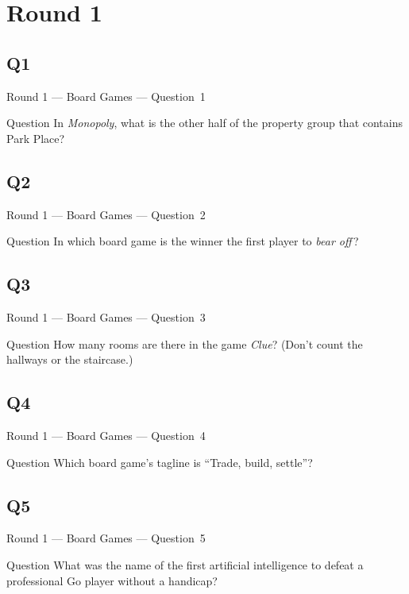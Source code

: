 \documentclass[11pt]{beamer}
\begin{document}
\section{Round 1}
\subsection*{Q1}
\begin{frame}[t]{Round 1 --- Board Games --- \mbox{Question 1}}
    \vspace{-0.5em}
    \begin{block}{Question}
        In \emph{Monopoly}, what is the other half of the property group that contains Park Place?
    \end{block}
\end{frame}
\subsection*{Q2}
\begin{frame}[t]{Round 1 --- Board Games --- \mbox{Question 2}}
    \vspace{-0.5em}
    \begin{block}{Question}
        In which board game is the winner the first player to \emph{bear off}\,?
    \end{block}
\end{frame}
\subsection*{Q3}
\begin{frame}[t]{Round 1 --- Board Games --- \mbox{Question 3}}
    \vspace{-0.5em}
    \begin{block}{Question}
        How many rooms are there in the game \emph{Clue}? (Don't count the hallways or the staircase.)
    \end{block}
\end{frame}
\subsection*{Q4}
\begin{frame}[t]{Round 1 --- Board Games --- \mbox{Question 4}}
    \vspace{-0.5em}
    \begin{block}{Question}
        Which board game's tagline is ``Trade, build, settle''?
    \end{block}
\end{frame}
\subsection*{Q5}
\begin{frame}[t]{Round 1 --- Board Games --- \mbox{Question 5}}
    \vspace{-0.5em}
    \begin{block}{Question}
        What was the name of the first artificial intelligence to defeat a professional Go player without a handicap?
    \end{block}
\end{frame}
\end{document}
